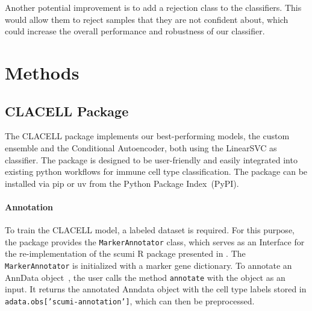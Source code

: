 \documentclass[11pt]{article}
\begin{document}
Another potential improvement is to add a rejection class to the classifiers. This would allow them to reject samples that they are not confident about, which could increase the overall performance and robustness of our classifier.


\section{Methods}\label{sec:methods}


\subsection{CLACELL Package}\label{sec:package}

The CLACELL package implements our best-performing models, the custom ensemble and the Conditional Autoencoder, both using the LinearSVC as classifier. The package is designed to be user-friendly and easily integrated into existing python workflows for immune cell type classification.
The package can be installed via pip or uv from the Python Package Index~(PyPI).

\paragraph{Annotation}

To train the CLACELL model, a labeled dataset is required. For this purpose, the package provides the \texttt{MarkerAnnotator} class, which serves as an Interface for the re-implementation of the scumi R package presented in . The  \texttt{MarkerAnnotator} is initialized with a marker gene dictionary. To annotate an AnnData object~\cite{virshup_anndata_2021}, the user calls the method \texttt{annotate} with the object as an input. It returns the annotated Anndata object with the cell type labels stored in \texttt{adata.obs['scumi-annotation']}, which can then be preprocessed.
\end{document}
